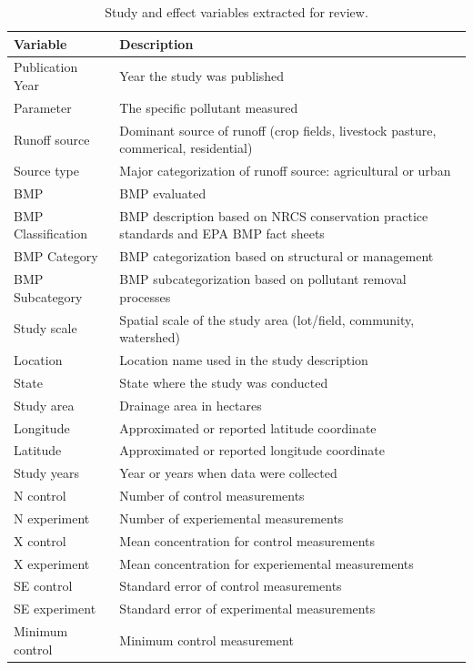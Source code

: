 \documentclass[utf8]{FrontiersinHarvard}
\begin{document}
\begin{table}

\caption{\label{tab:datvars}Study and effect variables extracted for review.}
\centering
\begin{tabular}[t]{>{\raggedright\arraybackslash}p{10em}>{\raggedright\arraybackslash}p{25em}}
\toprule
Variable & Description\\
\midrule
Publication Year & Year the study was published\\
Parameter & The specific pollutant measured\\
Runoff source & Dominant source of runoff (crop fields, livestock pasture, commerical, residential)\\
Source type & Major categorization of runoff source: agricultural or urban\\
BMP & BMP evaluated\\
\addlinespace
BMP Classification & BMP description based on NRCS conservation practice standards and EPA BMP fact sheets\\
BMP Category & BMP categorization based on structural or management\\
BMP Subcategory & BMP subcategorization based on pollutant removal processes\\
Study scale & Spatial scale of the study area (lot/field, community, watershed)\\
Location & Location name used in the study description\\
\addlinespace
State & State where the study was conducted\\
Study area & Drainage area in hectares\\
Longitude & Approximated or reported latitude coordinate\\
Latitude & Approximated or reported longitude coordinate\\
Study years & Year or years when data were collected\\
\addlinespace
N control & Number of control measurements\\
N experiment & Number of experiemental measurements\\
X control & Mean concentration for control measurements\\
X experiment & Mean concentration for experiemental measurements\\
SE control & Standard error of control measurements\\
\addlinespace
SE experiment & Standard error of experimental measurements\\
Minimum control & Minimum control measurement\\

\end{tabular}
\end{table}
\end{document}
